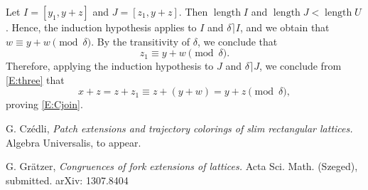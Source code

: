 \documentclass{amsart}
\newcommand{\pdelta}{\pmod{\delta}}
\DeclareMathOperator{\length}{length}
\begin{document}
Let $I=[y_1,y+ z]$ and $J=[z_1,y+ z]$. 
Then $\length I$ and $\length J  < \length U$. 
Hence, the induction hypothesis applies to $I$ 
and $\delta\rceil I$, and we obtain that 
$w \equiv y+ w \pdelta$. 
By the transitivity of $\delta$, we conclude that 
\begin{equation}\label{E:three}%
z_1 \equiv y+ w \pdelta.
\end{equation}
Therefore, applying the induction hypothesis to $J$ 
and $\delta \rceil J$, we conclude from \eqref{E:three} that 
\[
   x+ z = z + z_1 \equiv z + (y+ w) = y+ z \pdelta,
\] 
proving \eqref{E:Cjoin}.

\begin{thebibliography}{9}
G. Cz\'edli,
\emph{Patch extensions and trajectory colorings of slim
rectangular lattices.}
Algebra Universalis, to appear. 

G. Gr\"atzer, 
\emph{Congruences of fork extensions of lattices.}
Acta Sci. Math. (Szeged), submitted. arXiv: 1307.8404
\end{thebibliography}
\end{document}
